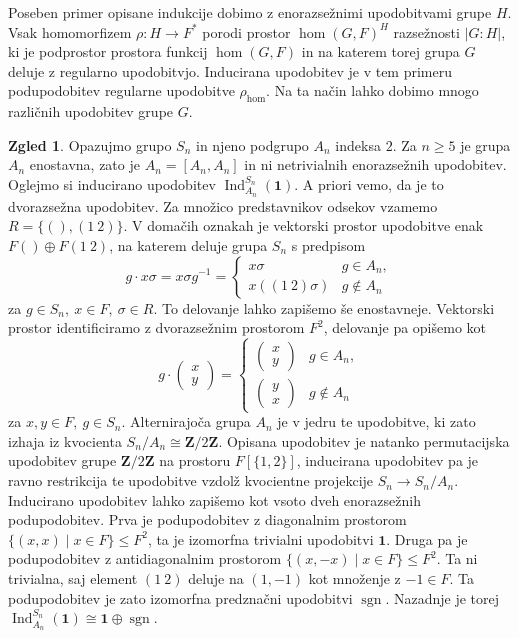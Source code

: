 \documentclass[11pt]{book}
\def\ZZ{\mathbf{Z}}
\def\11{\mathbf{1}}
\DeclareMathOperator\sgn{sgn}
\DeclareMathOperator\Ind{Ind}
\theoremstyle{definition}
\theoremstyle{zgled}
\newtheorem*{zgled}{Zgled}
\theoremstyle{odprtproblem}
\theoremstyle{domacanaloga}
\theoremstyle{izrek}
\begin{document}
Poseben primer opisane indukcije dobimo z enorazsežnimi upodobitvami grupe $H$. Vsak homomorfizem $\rho \colon H \to F^*$ porodi prostor $\hom(G,F)^H$ razsežnosti $|G:H|$, ki je podprostor prostora funkcij $\hom(G,F)$ in na katerem torej grupa $G$ deluje z regularno upodobitvjo. Inducirana upodobitev je v tem primeru podupodobitev regularne upodobitve $\rho_{\hom}$. Na ta način lahko dobimo mnogo različnih upodobitev grupe $G$.

\begin{zgled}
    Opazujmo grupo $S_n$ in njeno podgrupo $A_n$ indeksa $2$. Za $n \geq 5$ je grupa $A_n$ enostavna, zato je $A_n = [A_n, A_n]$ in ni netrivialnih enorazsežnih upodobitev. Oglejmo si inducirano upodobitev $\Ind^{S_n}_{A_n}(\11)$. A priori vemo, da je to dvorazsežna upodobitev. Za množico predstavnikov odsekov vzamemo $R = \{ (), (1 \ 2) \}$. V domačih oznakah je vektorski prostor upodobitve enak $F ()\oplus F (1 \ 2)$, na katerem deluje grupa $S_n$ s predpisom
    \[
        g \cdot x \sigma = x \sigma g^{-1} = \begin{cases}
            x \sigma   & g \in A_n, \\
            x \left((1 \ 2)\sigma\right)    & g \notin A_n
        \end{cases}
    \]
    za $g \in S_n, \ x \in F, \ \sigma \in R$. To delovanje lahko zapišemo še enostavneje. Vektorski prostor identificiramo z dvorazsežnim prostorom $F^2$, delovanje pa opišemo kot
    \[
        g \cdot \begin{pmatrix}
            x \\ y
        \end{pmatrix} =
        \begin{cases}
            \begin{pmatrix}
                x \\ y
            \end{pmatrix} & g \in A_n, \\
            \begin{pmatrix}
                y \\ x
            \end{pmatrix} & g \notin A_n
        \end{cases}
    \]
    za $x,y \in F, \ g \in S_n$. Alternirajoča grupa $A_n$ je v jedru te upodobitve, ki zato izhaja iz kvocienta $S_n/A_n \cong \ZZ/2\ZZ$. Opisana upodobitev je natanko permutacijska upodobitev grupe $\ZZ/2\ZZ$ na prostoru $F[\{ 1, 2 \}]$, inducirana upodobitev pa je ravno restrikcija te upodobitve vzdolž kvocientne projekcije $S_n \to S_n/A_n$. Inducirano upodobitev lahko zapišemo kot vsoto dveh enorazsežnih podupodobitev. Prva je podupodobitev z diagonalnim prostorom $\{ (x,x) \mid x \in F \} \leq F^2$, ta je izomorfna trivialni upodobitvi $\11$. Druga pa je podupodobitev z antidiagonalnim prostorom $\{ (x, -x) \mid x \in F \} \leq F^2$. Ta ni trivialna, saj element $(1 \ 2)$ deluje na $(1, -1)$ kot množenje z $-1 \in F$. Ta podupodobitev je zato izomorfna predznačni upodobitvi $\sgn$. Nazadnje je torej $\Ind^{S_n}_{A_n}(\11) \cong \11 \oplus \sgn$.
\end{zgled}
\end{document}
